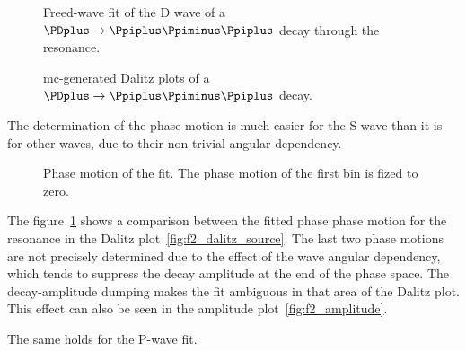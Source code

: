     \begin{figure}
        \centering

        \subfloat[][]{}

        \subfloat[][\label{fig:f2_amplitude}]{}


        \caption{Freed-wave fit of the D wave of a $\PDplus \to \Ppiplus\Ppiminus\Ppiplus$ decay through the \Pfii{} resonance.}
    \end{figure}

    \begin{figure}
        \centering


        \caption{\ac{mc}-generated Dalitz plots of a $\PDplus \to \Ppiplus\Ppiminus\Ppiplus$ decay.}

    \end{figure}

    The determination of the phase motion is much easier for the S wave than it is for other waves, due to their non-trivial angular dependency.
    \begin{figure}
        \centering
        
        \caption{Phase motion of the \Pfii{} fit. The phase motion of the first bin is fized to zero.}
        \label{fig:fit_f2_phase_motion}
    \end{figure}
    The figure~\ref{fig:fit_f2_phase_motion} shows a comparison between the fitted phase phase motion for the \Pfii{} resonance in the Dalitz plot~\ref{fig:f2_dalitz_source}. 
    The last two phase motions are not precisely determined due to the effect of the wave angular dependency, which tends to suppress the decay amplitude at the end of the phase space. 
    The decay-amplitude dumping makes the fit ambiguous in that area of the Dalitz plot.
    This effect can also be seen in the amplitude plot~\ref{fig:f2_amplitude}.


    The same holds for the P-wave \Prhozero{} fit.


    

